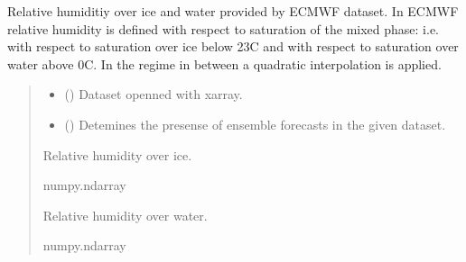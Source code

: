 \documentclass[a4paper,11pt,english]{sphinxmanual}
\begin{document}
\begin{fulllineitems}
\label{\detokenize{modules:climaccf.contrail.get_relative_hum}}
\pysigstartsignatures
{}
\pysigstopsignatures
\sphinxAtStartPar
Relative humiditiy over ice and water provided by ECMWF dataset. In ECMWF relative humidity is defined with respect 
to saturation of the mixed phase: i.e. with respect to saturation over ice below \sphinxhyphen{}23C and with respect to saturation over water above 0C. 
In the regime in between a quadratic interpolation is applied.
\begin{quote}\begin{description}
\begin{itemize}
\item {} 
\sphinxAtStartPar
{} () \textendash{} Dataset openned with xarray.

\item {} 
\sphinxAtStartPar
{} () \textendash{} Detemines the presense of ensemble forecasts in the given dataset.

\end{itemize}

\sphinxAtStartPar
Relative humidity over ice.

\sphinxAtStartPar
numpy.ndarray

\sphinxAtStartPar
Relative humidity over water.

\sphinxAtStartPar
numpy.ndarray

\end{description}\end{quote}

\end{fulllineitems}

\end{document}
